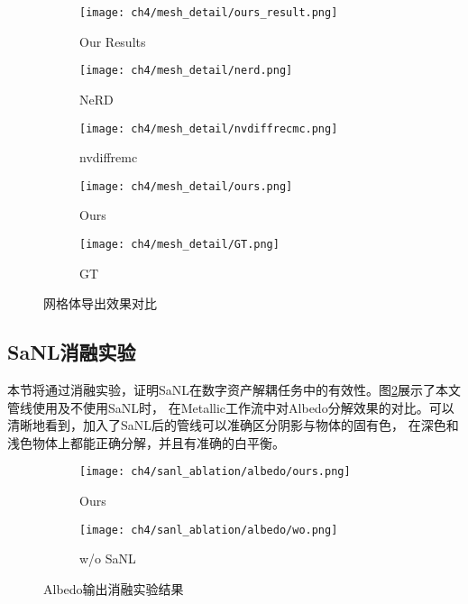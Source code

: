 \begin{figure}[H]
  \centering
  \begin{subfigure}[c]{0.32\textwidth}
    \centering
    \texttt{[image: ch4/mesh\_detail/ours\_result.png]}
    \caption{Our Results}
  \end{subfigure}
  \begin{subfigure}[c]{0.16\textwidth}
    \centering
    \texttt{[image: ch4/mesh\_detail/nerd.png]}
    \caption{NeRD}
  \end{subfigure}
  \hspace{0.1mm}
  \begin{subfigure}[c]{0.16\textwidth}
    \centering
    \texttt{[image: ch4/mesh\_detail/nvdiffrecmc.png]}
    \caption{nvdiffremc}
  \end{subfigure}
  \hspace{0.1mm}
  \begin{subfigure}[c]{0.16\textwidth}
    \centering
    \texttt{[image: ch4/mesh\_detail/ours.png]}
    \caption{Ours}
  \end{subfigure}
  \hspace{0.1mm}
  \begin{subfigure}[c]{0.16\textwidth}
    \centering
    \texttt{[image: ch4/mesh\_detail/GT.png]}
    \caption{GT}
  \end{subfigure}
  \caption{网格体导出效果对比}
  \label{fig:mesh_export_compare}
\end{figure}

\subsection{SaNL消融实验}

本节将通过消融实验，证明SaNL在数字资产解耦任务中的有效性。图\ref{fig:albedo_ablation}展示了本文管线使用及不使用SaNL时，
在Metallic工作流中对Albedo分解效果的对比。可以清晰地看到，加入了SaNL后的管线可以准确区分阴影与物体的固有色，
在深色和浅色物体上都能正确分解，并且有准确的白平衡。

\begin{figure}[H]
  \centering
  \begin{subfigure}[c]{0.47\textwidth}
    \centering
    \texttt{[image: ch4/sanl\_ablation/albedo/ours.png]}
    \caption{Ours}
  \end{subfigure}
  \begin{subfigure}[c]{0.47\textwidth}
    \centering
    \texttt{[image: ch4/sanl\_ablation/albedo/wo.png]}
    \caption{w/o SaNL}
  \end{subfigure}
  \caption{Albedo输出消融实验结果}
  \label{fig:albedo_ablation}
\end{figure}

